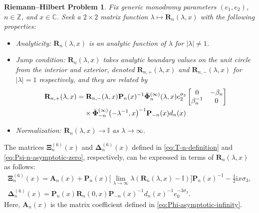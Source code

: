 \documentclass[11pt]{article}
\numberwithin{equation}{section}
\numberwithin{equation}{section}
\newtheorem{rhp}[Theorem]{Riemann--Hilbert Problem}
\newcommand{\ii}{\mathrm{i}}
\newcommand{\para}[1]{\breve{#1}}
\begin{document}
\begin{rhp}
Fix generic monodromy parameters $( e_1, e_2)$, $n\in\mathbb{Z}$, and $x\in\mathbb{C}$. Seek a $2\times 2$ matrix function $\lambda\mapsto\mathbf{R}_n(\lambda,x)$ with the following properties:
\begin{itemize}\itemsep=0pt
 \item Analyticity: $\mathbf{R}_n(\lambda,x)$ is an analytic function of $\lambda$ for $|\lambda|\neq 1$.
 \item Jump condition:
 $\mathbf{R}_n(\lambda,x)$ takes analytic boundary values on the unit circle from the interior and exterior, denoted $\mathbf{R}_{n,+}(\lambda,x)$ and $\mathbf{R}_{n,-}(\lambda,x)$ for $|\lambda|=1$ respectively, and they are related by
 \begin{align}
 & \mathbf{R}_{n,+}(\lambda,x)= \mathbf{R}_{n,-}(\lambda,x)\mathbf{P}_n(x)^{-1}\para{\mathbf{\Phi}}_n^{(\infty)}(\lambda,x)e_2^{\sigma_3}\begin{bmatrix}0 & -\beta_n\\\beta_n^{-1} & 0\end{bmatrix}\nonumber\\
 &\hphantom{\mathbf{R}_{n,+}(\lambda,x)=}{} \times
 \para{\mathbf{\Phi}}_{-n}^{(\infty)}\bigl(-\lambda^{-1},x\bigr)^{-1}\mathbf{P}_{-n}(x)d_n(x)\label{eq:R-jump}
 \end{align}
 \item Normalization:
 $\mathbf{R}_n(\lambda,x)\to\mathbb{I}$ as $\lambda\to\infty$.
\end{itemize}
\end{rhp}
The matrices $\mathbf{\Xi}_n^{(6)}(x)$ and $\mathbf{\Delta}_n^{(6)}(x)$ defined in \eqref{eq:T-n-definition} and \eqref{eq:Psi-n-asymptotic-zero}, respectively, can be expressed in terms of $\mathbf{R}_n(\lambda,x)$ as follows:
\begin{gather}
 \mathbf{\Xi}_n^{(6)}(x)=\mathbf{A}_n(x)+\mathbf{P}_n(x)\big[\lim_{\lambda\to\infty}\lambda(\mathbf{R}_n(\lambda,x)-\mathbb{I})\big]\mathbf{P}_n(x)^{-1}-\frac{1}{2}\ii x\sigma_3,\nonumber\\
 \mathbf{\Delta}_n^{(6)}(x)=\mathbf{P}_n(x)\mathbf{R}_n(0,x)\mathbf{P}_{-n}(x)^{-1}d_n(x)^{-1}e_0^{-3\sigma_3}.\label{eq:TU-R}
\end{gather}
Here, $\mathbf{A}_n(x)$ is the matrix coefficient defined in \eqref{eq:Phi-asymptotic-infinity}.
\end{document}
